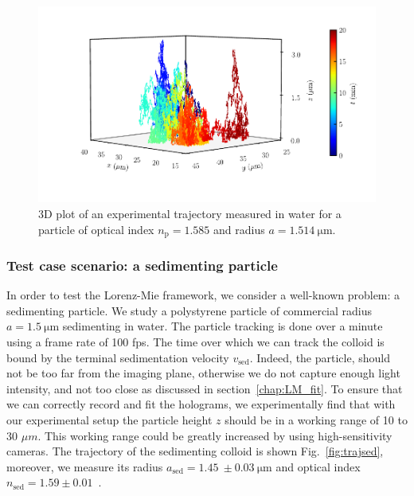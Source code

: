 \begin{figure}[H]
	\centering
	\includegraphics{02_body/chapter2/images/trajectory/traj.pdf}
	\caption{3D plot of an experimental trajectory measured in water for a particle of optical index $n_\mathrm{p} = 1.585$ and radius $a = 1.514  ~ \mathrm{\mu m}$.~\href{https://github.com/eXpensia/Confined-Brownian-Motion/blob/main/02_body/chapter2/images/trajectory/graph_ploting.ipynb}{\faGithub}}
	\label{fig:3dtrajec}
\end{figure}

\subsubsection{Test case scenario: a sedimenting particle}

In order to test the Lorenz-Mie framework, we consider a well-known problem: a sedimenting particle. We study a polystyrene particle of commercial radius $a = 1.5 ~ \mathrm{\mu m}$ sedimenting in water. The particle tracking is done over a minute using a frame rate of 100 \gls{fps}. The time over which we can track the colloid is bound by the terminal sedimentation velocity $v_\mathrm{sed}$. Indeed, the particle, should not be too far from the imaging plane, otherwise we do not capture enough light intensity, and not too close as discussed in section~\ref{chap:LM_fit}. To ensure that we can correctly record and fit the holograms, we experimentally find that with our experimental setup the particle height $z$ should be in a working range of 10 to 30 $\mu m$. This working range could be greatly increased by using high-sensitivity cameras. The trajectory of the sedimenting colloid is shown Fig.~\ref{fig:trajsed}, moreover, we measure its radius $a_\mathrm{sed} = 1.45 ~ \pm 0.03 ~ \mathrm{\mu m}$ and optical index $n_\mathrm{sed} = 1.59 \pm 0.01$~.


